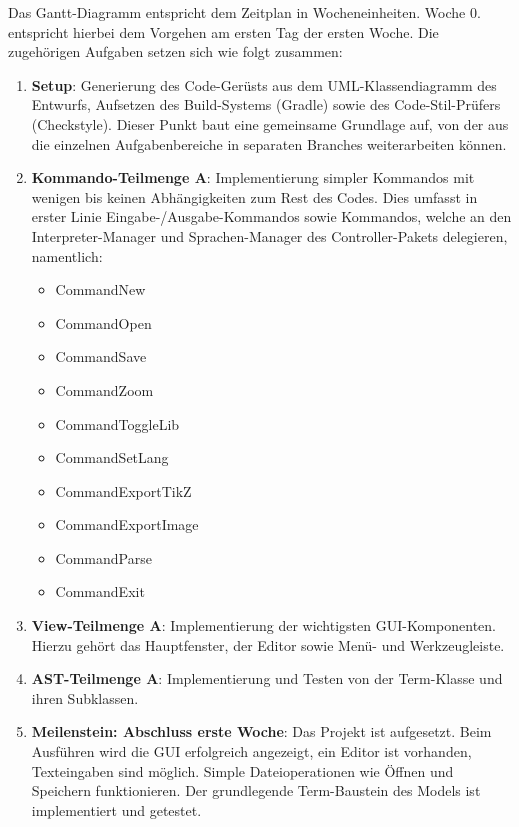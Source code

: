 \documentclass[parskip=full,11pt,twoside]{scrartcl}
\begin{document}
Das Gantt-Diagramm entspricht dem Zeitplan in Wocheneinheiten. Woche 0. entspricht hierbei dem Vorgehen am ersten Tag der ersten Woche. Die zugehörigen Aufgaben setzen sich wie folgt zusammen:
\begin{enumerate}
	\item \textbf{Setup}: Generierung des Code-Gerüsts aus dem UML-Klassendiagramm des Entwurfs, Aufsetzen des Build-Systems (Gradle) sowie des Code-Stil-Prüfers (Checkstyle). Dieser Punkt baut eine gemeinsame Grundlage auf, von der aus die einzelnen Aufgabenbereiche in separaten Branches weiterarbeiten können.
	
	\item \textbf{Kommando-Teilmenge A}: Implementierung simpler Kommandos mit wenigen bis keinen Abhängigkeiten zum Rest des Codes. Dies umfasst in erster Linie Eingabe-/Ausgabe-Kommandos sowie Kommandos, welche an den Interpreter-Manager und Sprachen-Manager des Controller-Pakets delegieren, namentlich:
	\begin{multicols}{3}
		\begin{itemize}
			\item CommandNew
			\item CommandOpen
			\item CommandSave
			\item CommandZoom

			\item CommandToggleLib
			\item CommandSetLang
			\item CommandExportTikZ
			\item CommandExportImage

			\item CommandParse
			\item CommandExit
		\end{itemize}
	\end{multicols}

	\item \textbf{View-Teilmenge A}: Implementierung der wichtigsten GUI-Komponenten. Hierzu gehört das Hauptfenster, der Editor sowie Menü- und Werkzeugleiste.
	
	\item \textbf{AST-Teilmenge A}: Implementierung und Testen von der Term-Klasse und ihren Subklassen.
	
	\item \textbf{Meilenstein: Abschluss erste Woche}: Das Projekt ist aufgesetzt. Beim Ausführen wird die GUI erfolgreich angezeigt, ein Editor ist vorhanden, Texteingaben sind möglich. Simple Dateioperationen wie Öffnen und Speichern funktionieren. Der grundlegende Term-Baustein des Models ist implementiert und getestet.


\end{enumerate}
\end{document}

